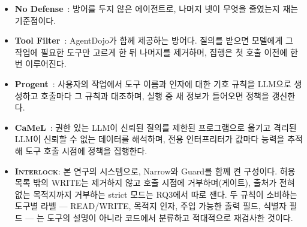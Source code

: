 \documentclass[acmsmall,screen,review,anonymous]{acmart}
\begin{document}
\begin{itemize}
    \item \textbf{No Defense}~\cite{debenedetti2024agentdojo}: 방어를 두지 않은 에이전트로, 나머지 넷이 무엇을 줄였는지 재는 기준점이다.
    \item \textbf{Tool Filter}~\cite{debenedetti2024agentdojo}: AgentDojo가 함께 제공하는 방어다. 질의를 받으면 모델에게 그 작업에 필요한 도구만 고르게 한 뒤 나머지를 제거하며, 집행은 첫 호출 이전에 한 번 이루어진다.
    \item \textbf{Progent}~\cite{shi2025progent}: 사용자의 작업에서 도구 이름과 인자에 대한 기호 규칙을 LLM으로 생성하고 호출마다 그 규칙과 대조하며, 실행 중 새 정보가 들어오면 정책을 갱신한다.
    \item \textbf{CaMeL}~\cite{debenedetti2025defeating}: 권한 있는 LLM이 신뢰된 질의를 제한된 프로그램으로 옮기고 격리된 LLM이 신뢰할 수 없는 데이터를 해석하며, 전용 인터프리터가 값마다 능력을 추적해 도구 호출 시점에 정책을 집행한다.
    \item \textbf{\textsc{Interlock}}: 본 연구의 시스템으로, Narrow와 Guard를 함께 켠 구성이다. 허용 목록 밖의 WRITE는 제거하지 않고 호출 시점에 거부하며(게이트), 출처가 전혀 없는 목적지까지 거부하는 strict 모드는 RQ3에서 따로 잰다. 두 규칙이 소비하는 도구별 라벨 --- READ/WRITE, 목적지 인자, 주입 가능한 출력 필드, 식별자 필드 --- 는 도구의 설명이 아니라 코드에서 분류하고 적대적으로 재검사한 것이다.
\end{itemize}
\end{document}
